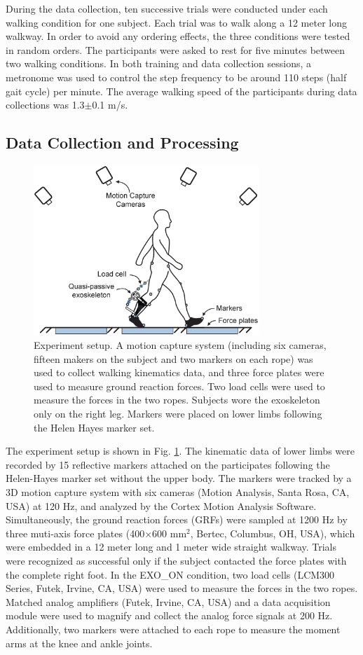 \documentclass[twocolumn,cleanfoot,10pt]{asme2ej}
\begin{document}
During the data collection, ten successive trials were conducted under each walking condition for one subject.
Each trial was to walk along a 12 meter long walkway.
In order to avoid any ordering effects, the three conditions were tested in random orders.
The participants were asked to rest for five minutes between two walking conditions.
In both training and data collection sessions, a metronome was used to control the step frequency to be around 110 steps (half gait cycle) per minute.
The average walking speed of the participants during data collections was 1.3$\pm$0.1 m/s.

\subsection{Data Collection and Processing}

\begin{figure}[bt]
	\centering
	\includegraphics[width=8.5cm]{environment.eps}
	\caption{Experiment setup.
	A motion capture system (including six cameras, fifteen makers on the subject and two markers on each rope) was used to collect walking kinematics data, and three force plates were used to measure ground reaction forces.
	Two load cells were used to measure the forces in the two ropes.
	Subjects wore the exoskeleton only on the right leg.
	Markers were placed on lower limbs following the Helen Hayes marker set.}
	\label{fig:Environment}
\end{figure}

The experiment setup is shown in Fig. \ref{fig:Environment}.
The kinematic data of lower limbs were recorded by 15 reflective markers attached on the participates following the Helen-Hayes marker set \cite{RN24} without the upper body.
The markers were tracked by a 3D motion capture system with six cameras (Motion Analysis, Santa Rosa, CA, USA) at 120 Hz, and analyzed by the Cortex Motion Analysis Software.
Simultaneously, the ground reaction forces (GRFs) were sampled at 1200 Hz by three muti-axis force plates (400$\times$600 mm$^{2}$, Bertec, Columbus, OH, USA), which were embedded in a 12 meter long and 1 meter wide straight walkway.
Trials were recognized as successful only if the subject contacted the force plates with the complete right foot.
In the EXO\_ON condition, two load cells (LCM300 Series, Futek, Irvine, CA, USA) were used to measure the forces in the two ropes.
Matched analog amplifiers (Futek, Irvine, CA, USA) and a data acquisition module were used to magnify and collect the analog force signals at 200 Hz.
Additionally, two markers were attached to each rope to measure the moment arms at the knee and ankle joints.
\end{document}
